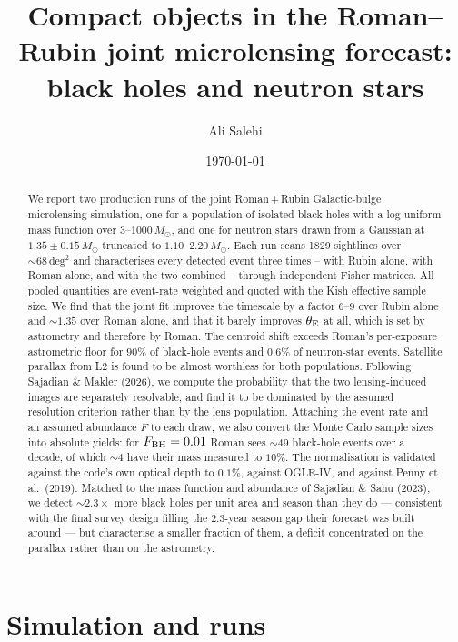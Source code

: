 \documentclass[english,10pt,a4paper]{article}
\title{Compact objects in the Roman--Rubin joint microlensing forecast:\\
       black holes and neutron stars}
\author{Ali Salehi}
\date{\today}
\newcommand{\tetE}{\theta_{\rm E}}
\newcommand{\Msun}{M_\odot}
\begin{document}
\maketitle

\begin{abstract}
We report two production runs of the joint Roman\,+\,Rubin Galactic-bulge microlensing
simulation, one for a population of isolated black holes with a log-uniform mass function over
$3$--$1000\,\Msun$, and one for neutron stars drawn from a Gaussian at $1.35\pm0.15\,\Msun$
truncated to $1.10$--$2.20\,\Msun$. Each run scans 1829 sightlines over $\sim\!68\,\mathrm{deg}^2$
and characterises every detected event three times -- with Rubin alone, with Roman alone, and
with the two combined -- through independent Fisher matrices. All pooled quantities are
event-rate weighted and quoted with the Kish effective sample size. We find that the joint fit
improves the timescale by a factor $6$--$9$ over Rubin alone and $\sim\!1.35$ over Roman
alone, and that it barely improves $\tetE$ at all, which is set by astrometry and therefore by
Roman. The centroid shift exceeds Roman's per-exposure astrometric floor for $90\%$ of
black-hole events and $0.6\%$ of neutron-star events. Satellite parallax from L2 is found to be
almost worthless for both populations. Following Sajadian \& Makler (2026), we compute the
probability that the two lensing-induced images are separately resolvable, and find it to be
dominated by the assumed resolution criterion rather than by the lens population. Attaching the
event rate and an assumed abundance $F$ to each draw, we also convert the Monte Carlo sample sizes
into absolute yields: for $F_{\rm BH}=0.01$ Roman sees $\sim\!49$ black-hole events over a decade,
of which $\sim\!4$ have their mass measured to $10\%$. The normalisation is validated against the
code's own optical depth to $0.1\%$, against OGLE-IV, and against Penny et al.\ (2019). Matched to
the mass function and abundance of Sajadian \& Sahu (2023), we detect $\sim\!2.3\times$ more
black holes per unit area and season than they do --- consistent with the final survey design
filling the $2.3$-year season gap their forecast was built around --- but characterise a smaller
fraction of them, a deficit concentrated on the parallax rather than on the astrometry.
\end{abstract}

\section{Simulation and runs}
\end{document}
